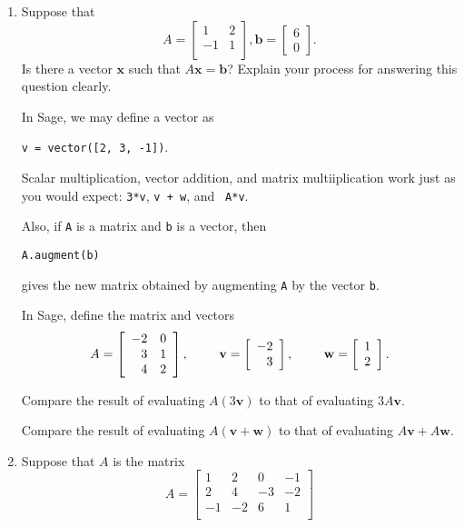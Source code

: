 \documentclass[12pt]{article}
\newcommand{\vs}[1]{\vspace{#1in}}
\newcommand{\bvec}{{\mathbf b}}
\newcommand{\vvec}{{\mathbf v}}
\newcommand{\wvec}{{\mathbf w}}
\newcommand{\xvec}{{\mathbf x}}
\newcommand{\twovec}[2]{\left[\begin{array}{r}#1 \\ #2
    \end{array}\right]}
\begin{document}
\begin{enumerate}
  \vs{1.5}
\item Suppose that
  $$
  A =
  \left[
    \begin{array}{rrrr}
      1 & 2 \\
      -1 & 1 \\
    \end{array}
  \right],
  \bvec = \left[
    \begin{array}{r}
      6 \\ 0
    \end{array}
  \right].
  $$
  Is there a vector $\xvec$ such that $A\xvec = \bvec$?  Explain your
  process for answering this question clearly.

  \newpage
  In Sage, we may define a vector as

  {\tt v = vector([2, 3, -1])}.

  Scalar multiplication, vector addition, and matrix multiiplication
  work just as you would expect:  {\tt 3*v}, {\tt v + w}, and {\tt
    A*v}.

  Also, if {\tt A} is a matrix and {\tt b} is a vector, then

  {\tt A.augment(b)}

  gives the new matrix obtained by augmenting {\tt A} by the vector
  {\tt b}.

  In Sage, define the matrix and vectors
  $$
  A =
  \left[
    \begin{array}{rr}
      -2 & 0 \\
      3 & 1 \\
      4 & 2 \\
    \end{array}
  \right],
  \hspace*{24pt}
  \vvec = \twovec{-2}3,
  \hspace*{24pt}
  \wvec = \twovec12.
  $$

  Compare the result of evaluating $A(3\vvec)$ to that of evaluating
  $3A\vvec$.

  \vs{1}
  
  Compare the result of evaluating $A(\vvec+\wvec)$ to that of evaluating
  $A\vvec + A\wvec$.

  \vs{1}

\item Suppose that $A$ is the matrix
  $$
  A = \left[
    \begin{array}{rrrr}
      1 & 2 & 0 & -1 \\
      2 & 4 & -3 & -2 \\
      -1 & -2 & 6 & 1 \\
    \end{array}
  \right]
  $$


\end{enumerate}
\end{document}
